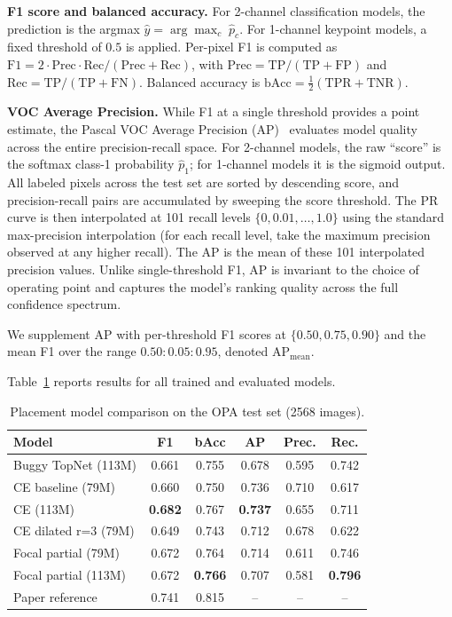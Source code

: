 \documentclass[10pt,twocolumn]{article}
\begin{document}
\textbf{F1 score and balanced accuracy.} For 2-channel classification models, the prediction is the argmax $\hat{y} = \arg\max_c \; \hat{p}_c$. For 1-channel keypoint models, a fixed threshold of $0.5$ is applied. Per-pixel F1 is computed as $\text{F1} = 2\cdot\text{Prec}\cdot\text{Rec} / (\text{Prec} + \text{Rec})$, with $\text{Prec} = \text{TP}/(\text{TP}+\text{FP})$ and $\text{Rec} = \text{TP}/(\text{TP}+\text{FN})$. Balanced accuracy is $\text{bAcc} = \frac{1}{2}(\text{TPR} + \text{TNR})$.

\textbf{VOC Average Precision.} While F1 at a single threshold provides a point estimate, the Pascal VOC Average Precision (AP)~\cite{voc} evaluates model quality across the entire precision-recall space. For 2-channel models, the raw ``score'' is the softmax class-1 probability $\hat{p}_1$; for 1-channel models it is the sigmoid output. All labeled pixels across the test set are sorted by descending score, and precision-recall pairs are accumulated by sweeping the score threshold. The PR curve is then interpolated at 101 recall levels $\{0, 0.01, \dots, 1.0\}$ using the standard max-precision interpolation (for each recall level, take the maximum precision observed at any higher recall). The AP is the mean of these 101 interpolated precision values. Unlike single-threshold F1, AP is invariant to the choice of operating point and captures the model's ranking quality across the full confidence spectrum.

We supplement AP with per-threshold F1 scores at $\{0.50, 0.75, 0.90\}$ and the mean F1 over the range $0.50:0.05:0.95$, denoted AP$_{\text{mean}}$.

Table~\ref{tab:results} reports results for all trained and evaluated models.

\begin{table}[t]
\centering
\caption{Placement model comparison on the OPA test set (2568 images).}
\label{tab:results}
{\small
\begin{tabular}{lccccc}
\toprule
Model & F1 & bAcc & AP & Prec. & Rec. \\
\midrule
Buggy TopNet (113M) & 0.661 & 0.755 & 0.678 & 0.595 & 0.742 \\
CE baseline (79M) & 0.660 & 0.750 & 0.736 & 0.710 & 0.617 \\
CE (113M) & \textbf{0.682} & 0.767 & \textbf{0.737} & 0.655 & 0.711 \\
CE dilated r=3 (79M) & 0.649 & 0.743 & 0.712 & 0.678 & 0.622 \\
Focal partial (79M) & 0.672 & 0.764 & 0.714 & 0.611 & 0.746 \\
Focal partial (113M) & 0.672 & \textbf{0.766} & 0.707 & 0.581 & \textbf{0.796} \\
\midrule
Paper reference~\cite{topnet} & 0.741 & 0.815 & -- & -- & -- \\
\bottomrule
\end{tabular}
}
\end{table}
\end{document}
